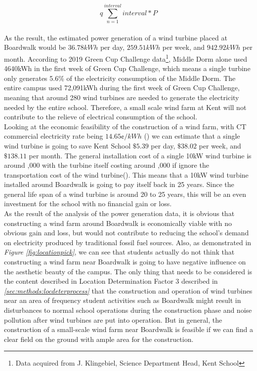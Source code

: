 \documentclass[review]{elsarticle}
\begin{document}
\begin{equation}q
    \label{equ:windenergy}
    \sum_{n=1}^{interval} interval*P
\end{equation}
\\\indent As the result, the estimated power generation of a wind turbine placed at Boardwalk would be $36.78kWh$ per day, $259.51kWh$ per week, 
and $942.92kWh$ per month. According to 2019 Green Cup Challenge data\footnote{Data acquired from J. Klingebiel, Science Department Head, Kent School}, 
Middle Dorm alone used 4640kWh in the first week of Green Cup Challenge, which means a single turbine only generates 5.6\% of the electricity 
consumption of the Middle Dorm. The entire campus used 72,091kWh during the first week of Green Cup Challenge, meaning that around 280 wind turbines 
are needed to generate the electricity needed by the entire school. Therefore, a small scale wind farm at Kent will not contribute to the relieve of electrical 
consumption of the school. 
\\\indent Looking at the economic feasibility of the construction of a wind farm, with CT commercial electricity rate being $14.65\cent/kWh$
(\cite{u.s._energy_information_administration_2019}) we can estimate that a single wind turbine is going to save Kent School $\mathdollar5.39$ per day, 
$\mathdollar38.02$ per week, and $\mathdollar138.11$ per month. The general installation cost of a single 10kW wind turbine is around ,000 
with the turbine itself costing around ,000 if ignore the transportation cost of the wind turbine(\cite{bergey_wind_power}). This means 
that a 10kW wind turbine installed around Boardwalk is going to pay itself back in 25 years. Since the general life span of a wind turbine is around 
20 to 25 years, this will be an even investment for the school with no financial gain or loss.
\\\indent As the result of the analysis of the power generation data, it is obvious that constructing a wind farm around Boardwalk is economically viable 
with no obvious gain and loss, but would not contribute to reducing the school's demand on electricity produced by traditional fossil fuel sources. Also, 
as demonstrated in \textit{Figure \ref{fig:locationpick}}, we can see that students actually do not think that constructing a wind farm near Boardwalk is 
going to have negative influence on the aesthetic beauty of the campus. The only thing that needs to be considered is the content described in Location 
Determination Factor 3 described in \textit{\ref{sec:methods:locdeterprocess}} that the construction and operation of wind turbines near an area of frequency 
student activities such as Boardwalk might result in disturbances to normal school operations during the construction phase and noise pollution after wind 
turbines are put into operation. But in general, the construction of a small-scale wind farm near Boardwalk is feasible if we can find a clear field on the 
ground with ample area for the construction.
\end{document}
